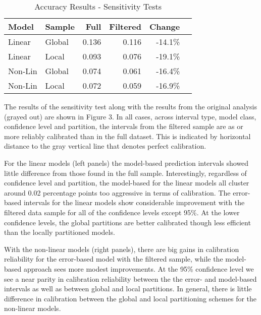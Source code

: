 \documentclass[colTwo]{anon}
\theoremstyle{definition}
\begin{document}
\begin{table}[h]
\centering
\begin{tabular}{l|l|r|r|r|r}
\hline
\textbf{Model} & \textbf{Sample} & \textbf{Full} & \textbf{Filtered} & \textbf{Change}\\
\hline
Linear & Global & 0.136 & 0.116 & -14.1\% \\
Linear & Local & 0.093 & 0.076 & -19.1\% \\
\hline
Non-Lin & Global & 0.074 & 0.061 & -16.4\% \\
Non-Lin & Local & 0.072 & 0.059 & -16.9\% \\
\hline
\end{tabular}
\caption{Accuracy Results - Sensitivity Tests}
\label{table:7}
\end{table}

The results of the sensitivity test along with the results from the original analysis (grayed out) are shown in Figure 3. In all cases, across interval type, model class, confidence level and partition, the intervals from the filtered sample are as or more reliably calibrated than in the full dataset. This is indicated by horizontal distance to the gray vertical line that denotes perfect calibration.  

For the linear models (left panels) the model-based prediction intervals showed little difference from those found in the full sample.  Interestingly, regardless of confidence level and partition, the model-based for the linear models all cluster around 0.02 percentage points too aggressive in terms of calibration.  The error-based intervals for the linear models show considerable improvement with the filtered data sample for all of the confidence levels except 95\%. At the lower confidence levels, the global partitions are better calibrated though less efficient than the locally partitioned models.

With the non-linear models (right panels), there are big gains in calibration reliability for the error-based model with the filtered sample, while the model-based approach sees more modest improvements.  At the 95\% confidence level we see a near parity in calibration reliability between the the error- and model-based intervals as well as between global and local partitions.  In general, there is little difference in calibration between the global and local partitioning schemes for the non-linear models.  
\end{document}
